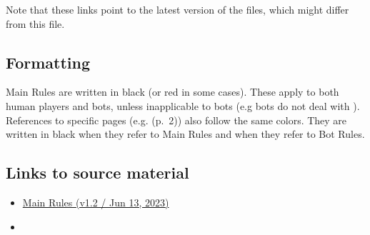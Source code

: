 \documentclass[10pt]{article}
\begin{document}
Note that these links point to the latest version of the files, which might differ from this file.

\subsection*{Formatting}

Main Rules are written in black (or {\color{redTextColor}red} in some cases). These apply to both human players and bots,
unless inapplicable to bots (e.g bots do not deal with \ducats).
References to specific pages (e.g. \dprime(p.~2)\dprime) also follow the same colors.
They are written in black when they refer to Main Rules and 
when they refer to Bot Rules.

\subsection*{Links to source material}

\begin{itemize}
  \item \href{https://boardgamegeek.com/filepage/240695/europa-universalis-price-power-main-rules}{Main Rules (v1.2 / Jun 13, 2023)}
  \item \href{https://boardgamegeek.com/filepage/240696/europa-universalis-price-power-solo-rules-10}{}
\end{itemize}


\end{document}
